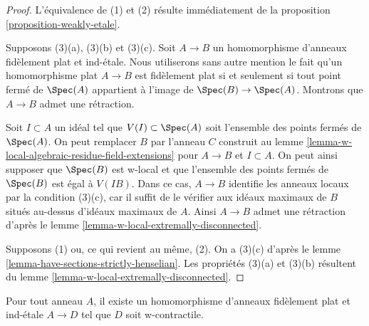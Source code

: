 \begin{proof}
L'équivalence de (1) et (2) résulte immédiatement de la
proposition \ref{proposition-weakly-etale}.

\medskip\noindent
Supposons (3)(a), (3)(b) et (3)(c). Soit $A \to B$ un homomorphisme d'anneaux fidèlement plat
et ind-\'etale. Nous utiliserons sans autre mention le fait qu'un homomorphisme plat
$A \to B$ est fidèlement plat si et seulement si tout point fermé
de $\Spec(A)$ appartient à l'image de $\Spec(B) \to \Spec(A)$.
Montrons que $A \to B$ admet une rétraction.

\medskip\noindent
Soit $I \subset A$ un idéal tel que $V(I) \subset \Spec(A)$ soit
l'ensemble des points fermés de $\Spec(A)$. 
On peut remplacer $B$ par l'anneau $C$ construit au
lemme \ref{lemma-w-local-algebraic-residue-field-extensions}
pour $A \to B$ et $I \subset A$.
On peut ainsi supposer que $\Spec(B)$ est w-local et que l'ensemble des
points fermés de $\Spec(B)$ est égal à $V(IB)$. Dans ce cas, $A \to B$
identifie les anneaux locaux par la condition (3)(c), car il suffit de le vérifier
aux idéaux maximaux de $B$ situés au-dessus d'idéaux maximaux de $A$.
Ainsi $A \to B$ admet une rétraction d'après le
lemme \ref{lemma-w-local-extremally-disconnected}.

\medskip\noindent
Supposons (1) ou, ce qui revient au même, (2). On a (3)(c) d'après le
lemme \ref{lemma-have-sections-strictly-henselian}.
Les propriétés (3)(a) et (3)(b) résultent du
lemme \ref{lemma-w-local-extremally-disconnected}.
\end{proof}

\begin{proposition}
\label{proposition-find-w-contractible}
Pour tout anneau $A$, il existe un homomorphisme d'anneaux fidèlement plat et ind-\'etale
$A \to D$ tel que $D$ soit w-contractile.
\end{proposition}

